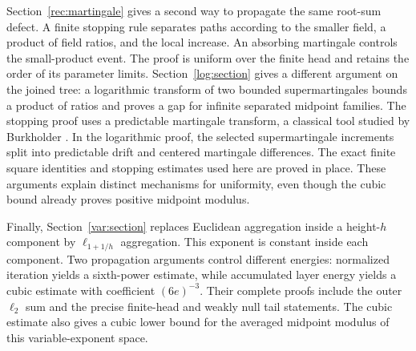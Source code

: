 Section~\ref{rec:martingale} gives a second way to propagate the same
root-sum defect. A finite stopping rule separates paths according to
the smaller field, a product of field ratios, and the local increase.
An absorbing martingale controls the small-product event. The proof
is uniform over the finite head and retains the order of its parameter
limits. Section~\ref{log:section} gives a different argument on the
joined tree: a logarithmic transform of two bounded supermartingales
bounds a product of ratios and proves a gap for infinite separated
midpoint families.
The stopping proof uses a predictable martingale transform, a classical
tool studied by Burkholder \cite{Burkholder1966}. In the logarithmic proof,
the selected supermartingale increments split into predictable drift and
centered martingale differences. The exact
finite square identities and stopping estimates used here are proved
in place. These arguments explain distinct mechanisms for uniformity, even
though the cubic bound already proves positive midpoint modulus.

Finally, Section~\ref{var:section} replaces Euclidean aggregation
inside a height-$h$ component by $\ell_{1+1/h}$ aggregation. This
exponent is constant inside each component. Two propagation arguments
control different energies: normalized iteration yields a sixth-power
estimate, while accumulated layer energy yields a cubic estimate with
coefficient $(6e)^{-3}$. Their complete proofs include the outer
$\ell_2$ sum and the precise finite-head and weakly null tail statements.
The cubic estimate also gives a cubic lower bound for the averaged
midpoint modulus of this variable-exponent space.
